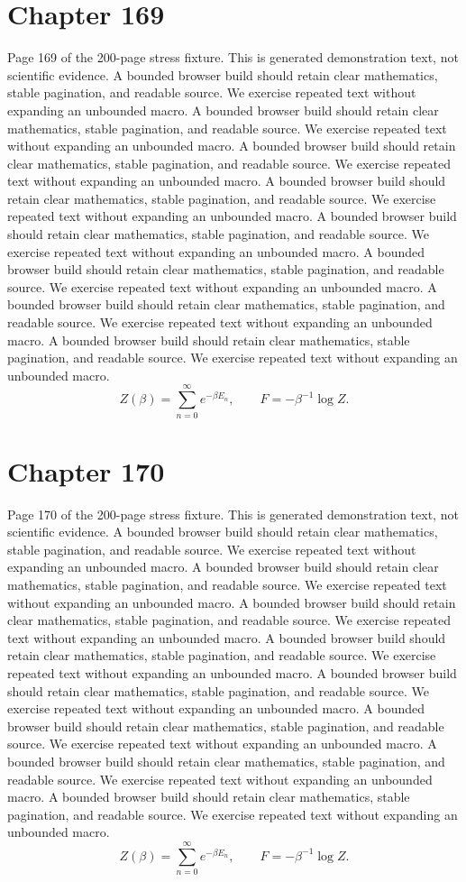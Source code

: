 \documentclass[11pt]{article}
\begin{document}
\section*{Chapter 169}
Page 169 of the 200-page stress fixture. This is generated demonstration text, not scientific evidence.
A bounded browser build should retain clear mathematics, stable pagination, and readable source. We exercise repeated text without expanding an unbounded macro.
A bounded browser build should retain clear mathematics, stable pagination, and readable source. We exercise repeated text without expanding an unbounded macro.
A bounded browser build should retain clear mathematics, stable pagination, and readable source. We exercise repeated text without expanding an unbounded macro.
A bounded browser build should retain clear mathematics, stable pagination, and readable source. We exercise repeated text without expanding an unbounded macro.
A bounded browser build should retain clear mathematics, stable pagination, and readable source. We exercise repeated text without expanding an unbounded macro.
A bounded browser build should retain clear mathematics, stable pagination, and readable source. We exercise repeated text without expanding an unbounded macro.
A bounded browser build should retain clear mathematics, stable pagination, and readable source. We exercise repeated text without expanding an unbounded macro.
A bounded browser build should retain clear mathematics, stable pagination, and readable source. We exercise repeated text without expanding an unbounded macro.
\[Z(\beta)=\sum_{n=0}^{\infty}e^{-\beta E_n},\qquad F=-\beta^{-1}\log Z.\]
\newpage
\section*{Chapter 170}
Page 170 of the 200-page stress fixture. This is generated demonstration text, not scientific evidence.
A bounded browser build should retain clear mathematics, stable pagination, and readable source. We exercise repeated text without expanding an unbounded macro.
A bounded browser build should retain clear mathematics, stable pagination, and readable source. We exercise repeated text without expanding an unbounded macro.
A bounded browser build should retain clear mathematics, stable pagination, and readable source. We exercise repeated text without expanding an unbounded macro.
A bounded browser build should retain clear mathematics, stable pagination, and readable source. We exercise repeated text without expanding an unbounded macro.
A bounded browser build should retain clear mathematics, stable pagination, and readable source. We exercise repeated text without expanding an unbounded macro.
A bounded browser build should retain clear mathematics, stable pagination, and readable source. We exercise repeated text without expanding an unbounded macro.
A bounded browser build should retain clear mathematics, stable pagination, and readable source. We exercise repeated text without expanding an unbounded macro.
A bounded browser build should retain clear mathematics, stable pagination, and readable source. We exercise repeated text without expanding an unbounded macro.
\[Z(\beta)=\sum_{n=0}^{\infty}e^{-\beta E_n},\qquad F=-\beta^{-1}\log Z.\]
\newpage
\end{document}
